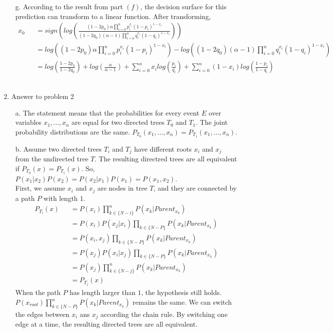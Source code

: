 \begin{enumerate}
\begin{enumerate}
\begin{eqnarray}
	\end{eqnarray}\\
	\item[g.] According to the result from part $(f)$, the decision surface for this prediction can transform to a linear function. After transforming,
	\begin{eqnarray}
		x_0 && = sign(log(\frac{(1-2p_0) \alpha \prod_{i=0}^{n} p_i^{x_i} (1-p_i)^{1-x_i}}{(1-2q_0) (\alpha - 1) \prod_{i=0}^{n} q_i^{x_i} (1-q_i)^{1-x_i}}))\\
		&& = log((1-2p_0) \alpha \prod_{i=0}^{n} p_i^{x_i} (1-p_i)^{1-x_i}) - log((1-2q_0) (\alpha - 1) \prod_{i=0}^{n} q_i^{x_i} (1-q_i)^{1-x_i})\\
		&& = log(\frac{1-2p_0}{1-2q_0}) + log(\frac{\alpha}{\alpha - 1}) + \sum_{i=0}^{n} x_i log(\frac{p_i}{q_i}) + \sum_{i=0}^{n} (1-x_i)log(\frac{1-p_i}{1-q_i})
	\end{eqnarray}\\
	\end{enumerate}
\item[2.] Answer to problem 2
	\begin{enumerate}
	\item[a.] The statement means that the probabilities for every event $E$ over variables $x_1,...,x_n$ are equal for two directed trees $T_0$ and $T_1$. The joint probability distributions are the same. $P_{T_0}(x_1,...,x_n) = P_{T_1}(x_1,...,x_n)$.
	\item[b.] Assume two directed trees $T_i$ and $T_j$ have different roots $x_i$ and $x_j$ from the undirected tree $T$. The resulting directred trees are all equivalent if $P_{T_0}(x) = P_{T_1}(x)$. So, $P(x_1|x_2)P(x_2) = P(x_2|x_1)P(x_1) = P(x_1,x_2)$. \\
	First, we assume $x_i$ and $x_j$ are nodes in tree $T$, and they are connected by a path $P$ with length $1$. 
	\begin{eqnarray}
		P_{T_i}(x) && = P(x_i) \prod_{k \in \{N - i\}}^n P(x_k|Parent_{x_k})\\
		&& = P(x_i)P(x_j|x_i) \prod_{k \in \{N-P\}} P(x_k|Parent_{x_k})\\
		&& = P(x_i,x_j) \prod_{k \in \{N-P\}} P(x_k|Parent_{x_k})\\
		&& = P(x_j)P(x_i|x_j) \prod_{k \in \{N-P\}} P(x_k|Parent_{x_k})\\
		&& = P(x_j) \prod_{k \in \{N - j\}}^n P(x_k|Parent_{x_k})\\
		&& = P_{T_j}(x)
	\end{eqnarray}
	When the path $P$ has length larger than $1$, the hypothesis still holds. $P(x_{root}) \prod_{k \in \{N - P\}}^n P(x_k|Parent_{x_k})$ remains the same. We can switch the edges between $x_i$ ans $x_j$ according the chain rule. By switching one edge at a time, the resulting directed trees are all equivalent.\\
	\end{enumerate}
\end{enumerate}



